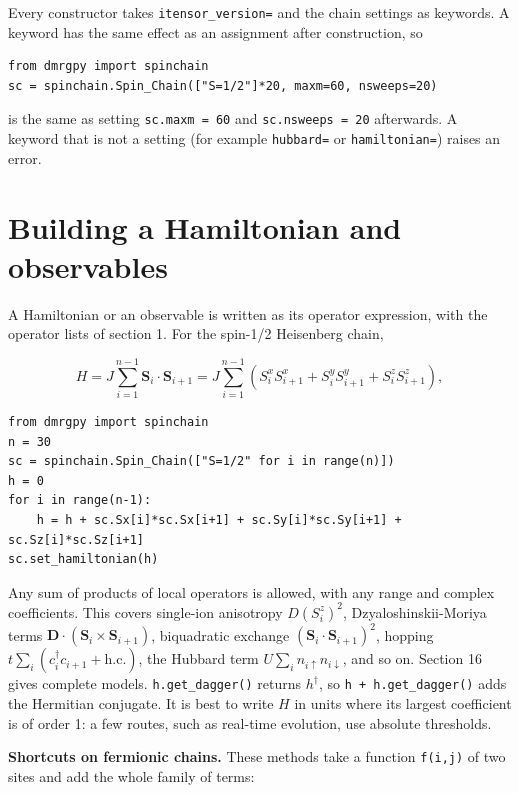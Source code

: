\documentclass[11pt]{article}
\begin{document}
Every constructor takes \texttt{itensor\_\allowbreak{}version=} and the chain settings as
keywords. A keyword has the same effect as an assignment after
construction, so

\begin{lstlisting}
from dmrgpy import spinchain
sc = spinchain.Spin_Chain(["S=1/2"]*20, maxm=60, nsweeps=20)
\end{lstlisting}

is the same as setting \texttt{sc.\allowbreak{}maxm\ =\ 60} and \texttt{sc.\allowbreak{}nsweeps\ =\ 20} afterwards. A
keyword that is not a setting (for example \texttt{hubbard=} or \texttt{hamiltonian=})
raises an error.

\section{Building a Hamiltonian and observables}

A Hamiltonian or an observable is written as its operator expression, with
the operator lists of section 1. For the spin-1/2 Heisenberg chain,

\[H=J\sum_{i=1}^{n-1}\mathbf S_i\cdot\mathbf S_{i+1}
=J\sum_{i=1}^{n-1}\left(S_i^xS_{i+1}^x+S_i^yS_{i+1}^y+S_i^zS_{i+1}^z\right),\]

\begin{lstlisting}
from dmrgpy import spinchain
n = 30
sc = spinchain.Spin_Chain(["S=1/2" for i in range(n)])
h = 0
for i in range(n-1):
    h = h + sc.Sx[i]*sc.Sx[i+1] + sc.Sy[i]*sc.Sy[i+1] + sc.Sz[i]*sc.Sz[i+1]
sc.set_hamiltonian(h)
\end{lstlisting}

Any sum of products of local operators is allowed, with any range and
complex coefficients. This covers single-ion anisotropy \(D(S^z_i)^2\),
Dzyaloshinskii-Moriya terms \(\mathbf D\cdot(\mathbf S_i\times\mathbf S_{i+1})\),
biquadratic exchange \((\mathbf S_i\cdot\mathbf S_{i+1})^2\), hopping
\(t\sum_i(c_i^\dagger c_{i+1}+\mathrm{h.c.})\), the Hubbard term
\(U\sum_in_{i\uparrow}n_{i\downarrow}\), and so on. Section 16 gives complete
models. \texttt{h.\allowbreak{}get\_\allowbreak{}dagger()} returns \(h^\dagger\), so \texttt{h\ +\ h.\allowbreak{}get\_\allowbreak{}dagger()} adds
the Hermitian conjugate. It is best to write \(H\) in units where its largest
coefficient is of order 1: a few routes, such as real-time evolution, use
absolute thresholds.

\textbf{Shortcuts on fermionic chains.} These methods take a function \texttt{f(i,j)}
of two sites and add the whole family of terms:
\end{document}
